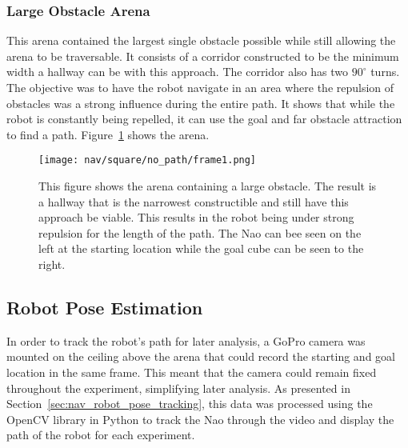 \subsubsection{Large Obstacle Arena}
This arena contained the largest single obstacle possible while still allowing the arena
to be traversable. It consists of a corridor constructed to be the minimum width
a hallway can be with this approach. The corridor also has two $90^\circ$ turns.
The objective was to have the robot navigate in an area where the repulsion of obstacles
was a strong influence during the entire path. It shows that while the robot is constantly being
repelled, it can use the goal and far obstacle attraction to find a path.
Figure~\ref{fig:nav_square_setup1} shows the arena.

\begin{figure}
  \texttt{[image: nav/square/no\_path/frame1.png]}
  \caption{This figure shows the arena containing a large obstacle. The result is a hallway
           that is the narrowest constructible and still have this approach be viable. This results
           in the robot being under strong repulsion for the length of the path.
           The Nao can bee seen on the left at the starting location
           while the goal cube can be seen to the right.}
  \label{fig:nav_square_setup1}
\end{figure}

\FloatBarrier
\subsection{Robot Pose Estimation} \label{subsec:robot_pose_est}
In order to track the robot's path for later analysis, a GoPro camera
was mounted on the ceiling above the arena that could record the starting and goal
location in the same frame. This meant that the camera could remain fixed throughout the
experiment, simplifying later analysis.
As presented in Section~\ref{sec:nav_robot_pose_tracking}, this data was processed
using the OpenCV library in Python to track the Nao through the video and display
the path of the robot for each experiment.
 



